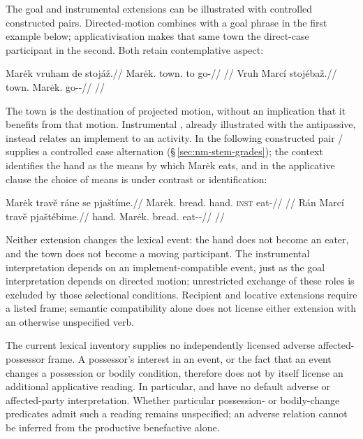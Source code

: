 The goal and instrumental extensions can be illustrated with controlled
constructed pairs. Directed-motion  combines with a goal phrase
in the first example below; applicativisation makes that same town the
direct-case participant in the second. Both retain contemplative aspect:

\pex\label{ex:val-appl-goal}
\a
\begingl
\gla Marėk vruham de stojáž.//
\glb Marėk.\Dir{} town.\Ind{} to go-\Ctpl{}//
\glft {}//
\endgl
\a
\begingl
\gla Vruh Marcí stojébaž.//
\glb town.\Dir{} Marėk.\Ind{} go-\Appl{}-\Ctpl{}//
\glft {}//
\endgl
\xe

The town is the destination of projected motion, without an implication that
it benefits from that motion. Instrumental , already illustrated
with the antipassive, instead relates an implement to an activity. In the
following constructed pair / supplies a controlled
case alternation (§\,\ref{sec:nm-stem-grades}); the context identifies the
hand as the means by which Marėk eats, and in the applicative clause
the choice of means is under contrast or identification:

\pex\label{ex:val-appl-instrument}
\a
\begingl
\gla Marėk travě ráne se pjaštíme.//
\glb Marėk.\Dir{} bread.\Ind{} hand.\Ind{} \textsc{inst} eat-\Prog{}//
\glft {}//
\endgl
\a
\begingl
\gla Rán Marcí travě pjaštébime.//
\glb hand.\Dir{} Marėk.\Ind{} bread.\Ind{} eat-\Appl{}-\Prog{}//
\glft {}//
\endgl
\xe

Neither extension changes the lexical event: the hand does not become an
eater, and the town does not become a moving participant. The instrumental
interpretation depends on an implement-compatible event, just as the goal
interpretation depends on directed motion; unrestricted exchange of these
roles is excluded by those selectional conditions. Recipient and locative
extensions require a listed frame; semantic compatibility alone does not
license either extension with an otherwise unspecified verb.

The current lexical inventory supplies no independently licensed
adverse affected-possessor frame. A possessor's interest in an event, or the
fact that an event changes a possession or bodily condition, therefore does
not by itself license an additional applicative reading. In particular,
 and  have no default adverse or
affected-party interpretation. Whether particular possession- or bodily-change
predicates admit such a reading remains unspecified; an adverse relation
cannot be inferred from the productive benefactive alone.

